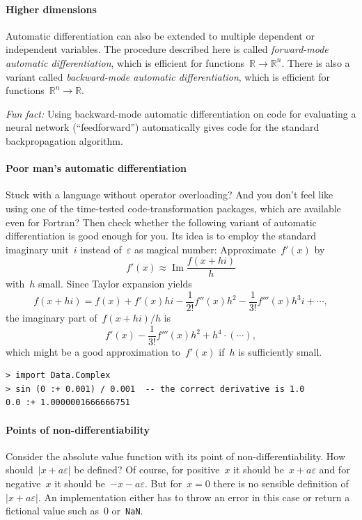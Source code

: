 \documentclass[a4paper,ngerman,12pt]{scrartcl}
\theoremstyle{definition}
\theoremstyle{plain}
\theoremstyle{remark}
\newcommand{\RR}{\mathbb{R}}
\begin{document}
\paragraph{Higher dimensions} Automatic differentiation can also be extended to
multiple dependent or independent variables. The procedure described here is
called \emph{forward-mode automatic differentiation}, which is efficient for
functions~$\RR \to \RR^n$. There is also a variant called \emph{backward-mode
automatic differentiation}, which is efficient for functions~$\RR^n \to \RR$.

\emph{Fun fact:} Using backward-mode automatic differentiation on code for
evaluating a neural network (``feedforward'') automatically gives code for the standard
backpropagation algorithm.

\paragraph{Poor man's automatic differentiation} Stuck with a language without
operator overloading? And you don't feel like using one of the time-tested
code-transformation packages, which are available even for Fortran? Then check whether the
following variant of automatic differentiation is good enough for you. Its idea
is to employ the standard imaginary unit~$i$ instead of~$\varepsilon$ as
magical number: Approximate~$f'(x)$ by
\[ f'(x) \approx \operatorname{Im} \frac{f(x+hi)}{h} \]
with~$h$ small. Since Taylor expansion yields
\[ f(x+hi) = f(x) + f'(x)hi - \frac{1}{2!}f''(x)h^2 - \frac{1}{3!}f'''(x)h^3i +
\cdots, \]
the imaginary part of~$f(x+hi)/h$ is
\[ f'(x) - \frac{1}{3!} f'''(x) h^2 + h^4 \cdot (\cdots), \]
which might be a good approximation to~$f'(x)$ if~$h$ is sufficiently small.

\begin{verbatim}> import Data.Complex
> sin (0 :+ 0.001) / 0.001  -- the correct derivative is 1.0
0.0 :+ 1.0000001666666751
\end{verbatim}

\paragraph{Points of non-differentiability} Consider the absolute value
function with its point of non-differentiability. How should~$|x +
a\varepsilon|$ be defined? Of course, for positive~$x$ it should be~$x +
a\varepsilon$ and for negative~$x$ it should be~$-x - a\varepsilon$. But for~$x
= 0$ there is no sensible definition of~$|x + a\varepsilon|$. An implementation
either has to throw an error in this case or return a fictional value such
as~$0$ or~\texttt{NaN}.
\end{document}
